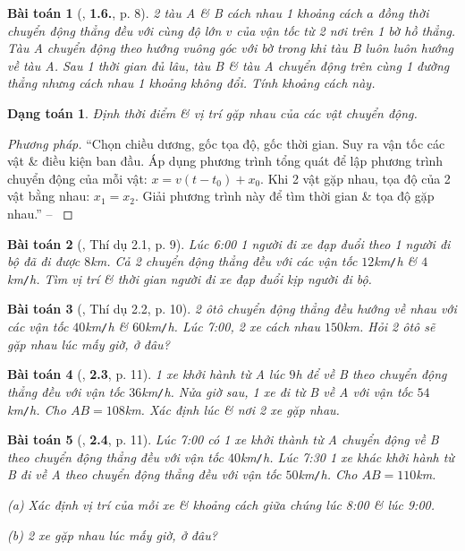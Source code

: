 \documentclass{article}
\numberwithin{equation}{section}
\newtheorem{dangtoan}{Dạng toán}[section]
\newtheorem{baitoan}{Bài toán}[section]
\begin{document}
\begin{baitoan}[\cite{Giai_Toan_Vat_Ly_10_tap_1}, \textbf{1.6.}, p. 8]
	2 tàu A \& B cách nhau 1 khoảng cách $a$ đồng thời chuyển động thẳng đều với cùng độ lớn $v$ của vận tốc từ 2 nơi trên 1 bờ hồ thẳng. Tàu A chuyển động theo hướng vuông góc với bờ trong khi tàu B luôn luôn hướng về tàu A. Sau 1 thời gian đủ lâu, tàu B \& tàu A chuyển động trên cùng 1 đường thẳng nhưng cách nhau 1 khoảng không đổi. Tính khoảng cách này.
\end{baitoan}

\begin{dangtoan}
	Định thời điểm \& vị trí gặp nhau của các vật chuyển động.
\end{dangtoan}

\begin{proof}[Phương pháp]
	``Chọn chiều dương, gốc tọa độ, gốc thời gian. Suy ra vận tốc các vật \& điều kiện ban đầu. Áp dụng phương trình tổng quát để lập phương trình chuyển động của mỗi vật: $x = v(t - t_0) + x_0$. Khi 2 vật gặp nhau, tọa độ của 2 vật bằng nhau: $x_1 = x_2$. Giải phương trình này để tìm thời gian \& tọa độ gặp nhau.'' -- \cite[p. 9]{Giai_Toan_Vat_Ly_10_tap_1}
\end{proof}

\begin{baitoan}[\cite{Giai_Toan_Vat_Ly_10_tap_1}, Thí dụ 2.1, p. 9]
	Lúc 6:00 1 người đi xe đạp đuổi theo 1 người đi bộ đã đi được $8$\emph{km}. Cả 2 chuyển động thẳng đều với các vận tốc $12$\emph{km\texttt{/}h} \& $4$\emph{km\texttt{/}h}. Tìm vị trí \& thời gian người đi xe đạp đuổi kịp người đi bộ.
\end{baitoan}

\begin{baitoan}[\cite{Giai_Toan_Vat_Ly_10_tap_1}, Thí dụ 2.2, p. 10]
	\label{thi du 2.2}
	2 ôtô chuyển động thẳng đều hướng về nhau với các vận tốc $40$\emph{km\texttt{/}h} \& $60$\emph{km\texttt{/}h}. Lúc 7:00, 2 xe cách nhau $150$\emph{km}. Hỏi 2 ôtô sẽ gặp nhau lúc mấy giờ, ở đâu?
\end{baitoan}

\begin{baitoan}[\cite{Giai_Toan_Vat_Ly_10_tap_1}, \textbf{2.3}, p. 11]
	1 xe khởi hành từ A lúc $9$h để về B theo chuyển động thẳng đều với vận tốc $36$\emph{km\texttt{/}h}. Nửa giờ sau, 1 xe đi từ B về A với vận tốc $54$\emph{km\texttt{/}h}. Cho $AB = 108$\emph{km}. Xác định lúc \& nơi 2 xe gặp nhau.
\end{baitoan}

\begin{baitoan}[\cite{Giai_Toan_Vat_Ly_10_tap_1}, \textbf{2.4}, p. 11]
	Lúc 7:00 có 1 xe khởi thành từ A chuyển động về B theo chuyển động thẳng đều với vận tốc $40$\emph{km\texttt{/}h}. Lúc 7:30 1 xe khác khởi hành từ B đi về A theo chuyển động thẳng đều với vận tốc $50$\emph{km\texttt{/}h}. Cho $AB = 110$\emph{km}.
	\begin{enumerate*}
		\item[(a)] Xác định vị trí của mỗi xe \& khoảng cách giữa chúng lúc 8:00 \& lúc 9:00.
		\item[(b)] 2 xe gặp nhau lúc mấy giờ, ở đâu?
	\end{enumerate*}
\end{baitoan}
\end{document}
